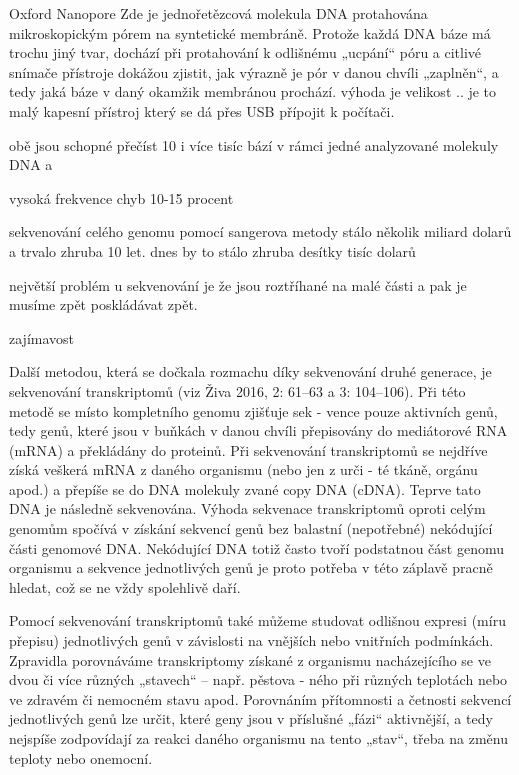 \documentclass[czech,DP]{thesiskiv}
\begin{document}
Oxford Nanopore
 Zde je jednořetězcová molekula DNA protahována mikroskopickým pórem na syntetické membráně.
Protože každá DNA báze má trochu jiný
tvar, dochází při protahování k odlišnému
„ucpání“ póru a citlivé snímače přístroje
dokážou zjistit, jak výrazně je pór v danou
chvíli „zaplněn“, a tedy jaká báze v daný
okamžik membránou prochází.
výhoda je velikost .. je to malý kapesní přístroj který se dá přes USB přípojit k počítači. 

obě jsou schopné přečíst 10 i více tisíc bází v rámci jedné analyzované molekuly DNA a 

vysoká frekvence chyb 10-15 procent

sekvenování celého genomu pomocí sangerova metody stálo několik miliard dolarů a trvalo zhruba 10 let.
dnes by to stálo zhruba desítky tisíc dolarů 

největší problém u sekvenování je že jsou roztříhané na malé části a pak je musíme zpět poskládávat zpět.


zajímavost

Další metodou, která se dočkala rozmachu díky sekvenování druhé generace, je
sekvenování transkriptomů (viz Živa 2016,
2: 61–63 a 3: 104–106). Při této metodě se
místo kompletního genomu zjišťuje sek -
vence pouze aktivních genů, tedy genů,
které jsou v buňkách v danou chvíli přepisovány do mediátorové RNA (mRNA)
a překládány do proteinů. Při sekvenování
transkriptomů se nejdříve získá veškerá
mRNA z daného organismu (nebo jen z urči -
té tkáně, orgánu apod.) a přepíše se do DNA
molekuly zvané copy DNA (cDNA). Teprve
tato DNA je následně sekvenována. Výhoda sekvenace transkriptomů oproti celým
genomům spočívá v získání sekvencí genů
bez balastní (nepotřebné) nekódující části
genomové DNA. Nekódující DNA totiž často tvoří podstatnou část genomu organismu a sekvence jednotlivých genů je proto
potřeba v této záplavě pracně hledat, což
se ne vždy spolehlivě daří. 


Pomocí sekvenování transkriptomů také
můžeme studovat odlišnou expresi (míru
přepisu) jednotlivých genů v závislosti na
vnějších nebo vnitřních podmínkách. Zpravidla porovnáváme transkriptomy získané z organismu nacházejícího se ve dvou
či více různých „stavech“ – např. pěstova -
ného při různých teplotách nebo ve zdravém či nemocném stavu apod. Porovnáním
přítomnosti a četnosti sekvencí jednotlivých genů lze určit, které geny jsou v příslušné „fázi“ aktivnější, a tedy nejspíše
zodpovídají za reakci daného organismu
na tento „stav“, třeba na změnu teploty
nebo onemocní.
\end{document}
